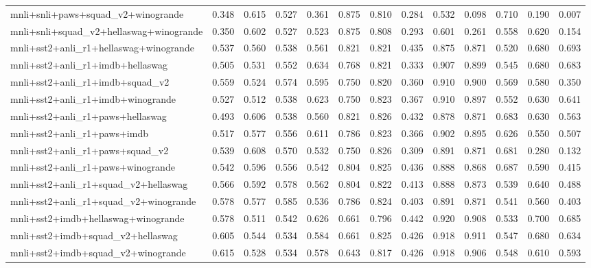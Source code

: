 \begin{table}[t]
\begin{tabular}{lrrrrrrrrrrrr}
    mnli+snli+paws+squad\_v2+winogrande & 0.348 & 0.615 & 0.527 & 0.361 & 0.875 & 0.810 & 0.284 & 0.532 & 0.098 & 0.710 & 0.190 & 0.007 \\
    mnli+snli+squad\_v2+hellaswag+winogrande & 0.350 & 0.602 & 0.527 & 0.523 & 0.875 & 0.808 & 0.293 & 0.601 & 0.261 & 0.558 & 0.620 & 0.154 \\
    mnli+sst2+anli\_r1+hellaswag+winogrande & 0.537 & 0.560 & 0.538 & 0.561 & 0.821 & 0.821 & 0.435 & 0.875 & 0.871 & 0.520 & 0.680 & 0.693 \\
    mnli+sst2+anli\_r1+imdb+hellaswag & 0.505 & 0.531 & 0.552 & 0.634 & 0.768 & 0.821 & 0.333 & 0.907 & 0.899 & 0.545 & 0.680 & 0.683 \\
    mnli+sst2+anli\_r1+imdb+squad\_v2 & 0.559 & 0.524 & 0.574 & 0.595 & 0.750 & 0.820 & 0.360 & 0.910 & 0.900 & 0.569 & 0.580 & 0.350 \\
    mnli+sst2+anli\_r1+imdb+winogrande & 0.527 & 0.512 & 0.538 & 0.623 & 0.750 & 0.823 & 0.367 & 0.910 & 0.897 & 0.552 & 0.630 & 0.641 \\
    mnli+sst2+anli\_r1+paws+hellaswag & 0.493 & 0.606 & 0.538 & 0.560 & 0.821 & 0.826 & 0.432 & 0.878 & 0.871 & 0.683 & 0.630 & 0.563 \\
    mnli+sst2+anli\_r1+paws+imdb & 0.517 & 0.577 & 0.556 & 0.611 & 0.786 & 0.823 & 0.366 & 0.902 & 0.895 & 0.626 & 0.550 & 0.507 \\
    mnli+sst2+anli\_r1+paws+squad\_v2 & 0.539 & 0.608 & 0.570 & 0.532 & 0.750 & 0.826 & 0.309 & 0.891 & 0.871 & 0.681 & 0.280 & 0.132 \\
    mnli+sst2+anli\_r1+paws+winogrande & 0.542 & 0.596 & 0.556 & 0.542 & 0.804 & 0.825 & 0.436 & 0.888 & 0.868 & 0.687 & 0.590 & 0.415 \\
    mnli+sst2+anli\_r1+squad\_v2+hellaswag & 0.566 & 0.592 & 0.578 & 0.562 & 0.804 & 0.822 & 0.413 & 0.888 & 0.873 & 0.539 & 0.640 & 0.488 \\
    mnli+sst2+anli\_r1+squad\_v2+winogrande & 0.578 & 0.577 & 0.585 & 0.536 & 0.786 & 0.824 & 0.403 & 0.891 & 0.871 & 0.541 & 0.560 & 0.403 \\
    mnli+sst2+imdb+hellaswag+winogrande & 0.578 & 0.511 & 0.542 & 0.626 & 0.661 & 0.796 & 0.442 & 0.920 & 0.908 & 0.533 & 0.700 & 0.685 \\
    mnli+sst2+imdb+squad\_v2+hellaswag & 0.605 & 0.544 & 0.534 & 0.584 & 0.661 & 0.825 & 0.426 & 0.918 & 0.911 & 0.547 & 0.680 & 0.634 \\
    mnli+sst2+imdb+squad\_v2+winogrande & 0.615 & 0.528 & 0.534 & 0.578 & 0.643 & 0.817 & 0.426 & 0.918 & 0.906 & 0.548 & 0.610 & 0.593 \\

\end{tabular}
\end{table}
